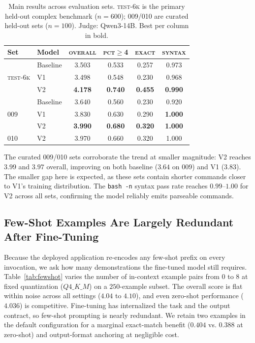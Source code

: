 \documentclass[conference]{IEEEtran}
\begin{document}
\begin{table}[t]
\caption{Main results across evaluation sets. \textsc{test-6k} is the primary
held-out complex benchmark ($n{=}600$); \textsc{009}/\textsc{010} are curated
held-out sets ($n{=}100$). Judge: Qwen3-14B. Best per column in bold.}
\label{tab:main}
\centering
\footnotesize
\begin{tabular}{llcccc}
\toprule
Set & Model & \textsc{overall} & \textsc{pct$\geq$4} & \textsc{exact} & \textsc{syntax} \\
\midrule
\multirow{3}{*}{\textsc{test-6k}}
 & Baseline & 3.503 & 0.533 & 0.257 & 0.973 \\
 & V1       & 3.498 & 0.548 & 0.230 & 0.968 \\
 & V2       & \textbf{4.178} & \textbf{0.740} & \textbf{0.455} & \textbf{0.990} \\
\midrule
\multirow{3}{*}{\textsc{009}}
 & Baseline & 3.640 & 0.560 & 0.230 & 0.920 \\
 & V1       & 3.830 & 0.630 & 0.290 & \textbf{1.000} \\
 & V2       & \textbf{3.990} & \textbf{0.680} & \textbf{0.320} & \textbf{1.000} \\
\midrule
\textsc{010} & V2 & 3.970 & 0.660 & 0.320 & 1.000 \\
\bottomrule
\end{tabular}
\end{table}

The curated \textsc{009}/\textsc{010} sets corroborate the trend at smaller
magnitude: V2 reaches $3.99$ and $3.97$ overall, improving on both baseline
($3.64$ on \textsc{009}) and V1 ($3.83$). The smaller gap here is expected, as
these sets contain shorter commands closer to V1's training distribution. The
\texttt{bash -n} syntax pass rate reaches $0.99$--$1.00$ for V2 across all sets,
confirming the model reliably emits parseable commands.

\subsection{Few-Shot Examples Are Largely Redundant After Fine-Tuning}

Because the deployed application re-encodes any few-shot prefix on every
invocation, we ask how many demonstrations the fine-tuned model still requires.
Table~\ref{tab:fewshot} varies the number of in-context example pairs from $0$
to $8$ at fixed quantization ($Q4\_K\_M$) on a $250$-example subset. The overall
score is flat within noise across all settings ($4.04$ to $4.10$), and even
zero-shot performance ($4.036$) is competitive. Fine-tuning has internalized the
task and the output contract, so few-shot prompting is nearly redundant. We
retain two examples in the default configuration for a marginal exact-match
benefit ($0.404$ vs. $0.388$ at zero-shot) and output-format anchoring at
negligible cost.
\end{document}
